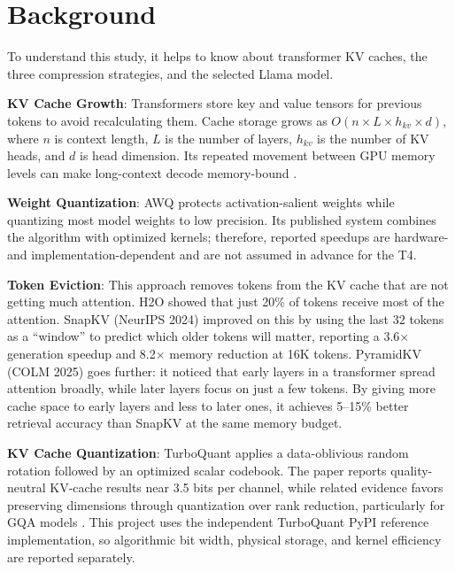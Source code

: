 \documentclass[conference]{IEEEtran}
\begin{document}
\section{Background}

To understand this study, it helps to know about transformer KV caches, the three compression strategies, and the selected Llama model.

\textbf{KV Cache Growth}: Transformers store key and value tensors for previous tokens to avoid recalculating them. Cache storage grows as $O(n \times L \times h_{kv} \times d)$, where $n$ is context length, $L$ is the number of layers, $h_{kv}$ is the number of KV heads, and $d$ is head dimension. Its repeated movement between GPU memory levels can make long-context decode memory-bound \cite{li_snapkv_nodate,liu_kivi_2023}.

\textbf{Weight Quantization}: AWQ \cite{lin_awq_2025} protects activation-salient weights while quantizing most model weights to low precision. Its published system combines the algorithm with optimized kernels; therefore, reported speedups are hardware- and implementation-dependent and are not assumed in advance for the T4.

\textbf{Token Eviction}: This approach removes tokens from the KV cache that are not getting much attention. H2O \cite{zhang_h2o_nodate} showed that just 20\% of tokens receive most of the attention. SnapKV \cite{li_snapkv_nodate} (NeurIPS 2024) improved on this by using the last 32 tokens as a ``window'' to predict which older tokens will matter, reporting a 3.6$\times$ generation speedup and 8.2$\times$ memory reduction at 16K tokens. PyramidKV \cite{cai_pyramidkv_2025} (COLM 2025) goes further: it noticed that early layers in a transformer spread attention broadly, while later layers focus on just a few tokens. By giving more cache space to early layers and less to later ones, it achieves 5--15\% better retrieval accuracy than SnapKV at the same memory budget.

\textbf{KV Cache Quantization}: TurboQuant \cite{zandieh_turboquant_2025} applies a data-oblivious random rotation followed by an optimized scalar codebook. The paper reports quality-neutral KV-cache results near 3.5 bits per channel, while related evidence favors preserving dimensions through quantization over rank reduction, particularly for GQA models \cite{salfati_quantization_2026}. This project uses the independent TurboQuant PyPI reference implementation, so algorithmic bit width, physical storage, and kernel efficiency are reported separately.
\end{document}
